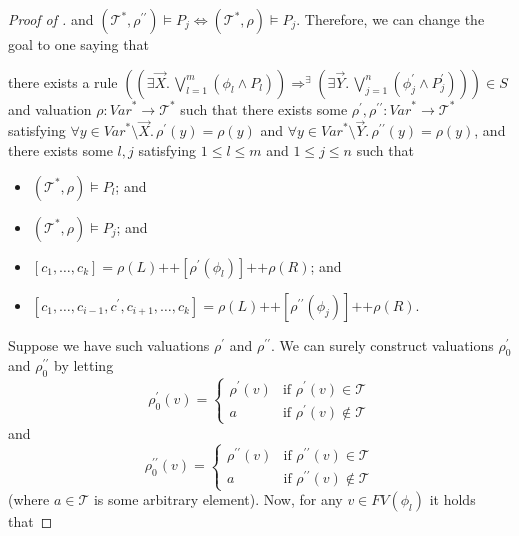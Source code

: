 \documentclass{article}
\newenvironment{proofenv}
  {
    \VerbatimEnvironment\begin{tcolorbox}[colback=black!0!white] %
  }
  {
   \end{tcolorbox}
  }
\begin{document}
\begin{proof}[Proof of ]
and $(\mathcal{T}^*, \rho^{\prime\prime}) \vDash P_j \iff (\mathcal{T}^*, \rho) \vDash P_j$.
Therefore, we can change the goal to one saying that
\begin{proofenv}
there exists a rule $((\exists \vec{X}.\, \bigvee_{l=1}^{m} (\phi_l \land P_l)) \Rightarrow^\exists (\exists \vec{Y}.\, \bigvee_{j=1}^{n} (\phi^\prime_j \land P^\prime_j))) \in S$
and valuation $\rho : \mathit{Var}^* \to \mathcal{T}^*$ such that
there exists some $\rho^\prime,\rho^{\prime\prime} : \mathit{Var}^* \to \mathcal{T}^*$
satisfying $\forall y \in \mathit{Var}^* \setminus \vec{X}.\, \rho^\prime(y) = \rho(y)$
and $\forall y \in \mathit{Var}^* \setminus \vec{Y}.\, \rho^{\prime\prime}(y) = \rho(y)$,
and there exists some $l,j$ satisfying $1 \leq l \leq m$ and $1 \leq j \leq n$ such that
\begin{itemize}
    \item $(\mathcal{T}^*, \rho) \vDash P_l$; and
    \item $(\mathcal{T}^*, \rho) \vDash P_j$; and
    \item $[c_1,\ldots,c_k] = \rho(L) \texttt{++} [\rho^\prime(\phi_l)] \texttt{++} \rho(R)$; and
    \item $[c_1, \ldots, c_{i-1}, c^\prime, c_{i+1}, \ldots, c_k] = \rho(L) \texttt{++} [\rho^{\prime\prime}(\phi_j)] 
    \texttt{++} \rho(R)$.
\end{itemize}
\end{proofenv}
Suppose we have such valuations $\rho^\prime$ and $\rho^{\prime\prime}$.
We can surely construct valuations $\rho_0^\prime$ and $\rho_0^{\prime\prime}$ by letting
\begin{equation*}
\rho_0^\prime(v)=
    \begin{cases}
        \rho^\prime(v) & \text{if } \rho^\prime(v) \in \mathcal{T}\\
        a & \text{if } \rho^\prime(v) \not\in \mathcal{T}
    \end{cases}
\end{equation*}
and
\begin{equation*}
\rho_0^{\prime\prime}(v)=
    \begin{cases}
        \rho^{\prime\prime}(v) & \text{if } \rho^{\prime\prime}(v) \in \mathcal{T}\\
        a & \text{if } \rho^{\prime\prime}(v) \not\in \mathcal{T}
    \end{cases}
\end{equation*}
(where $a \in \mathcal{T}$ is some arbitrary element).
Now, for any $v \in \mathit{FV}(\phi_l)$ it holds that

\end{proof}
\end{document}
